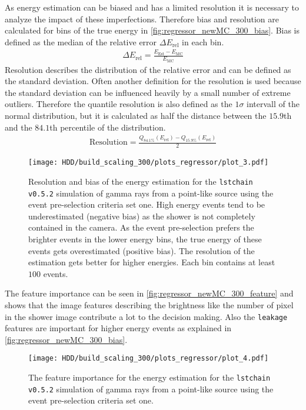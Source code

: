 As energy estimation can be biased and has a limited resolution it is necessary to analyze the impact of these imperfections. 
Therefore bias and resolution are calculated for bins of the true energy in \autoref{fig:regressor_newMC_300_bias}.
Bias is defined as the median of the relative error $\Delta E_\text{rel}$ in each bin.
\begin{align}
    \Delta E_\text{rel} = \frac{E_\text{Est} - E_\text{MC}}{E_\text{MC}}
\end{align}
Resolution describes the distribution of the relative error and can be defined as the standard deviation.
Often another definition for the resolution is used because the standard deviation can be influenced heavily by a small number of extreme outliers.
Therefore the quantile resolution is also defined as the $1\sigma$ intervall of the normal distribution, but it is calculated as half the distance 
between the $\num{15.9}$th and the $\num{84.1}$th percentile of the distribution.
\begin{align}
    \text{Resolution} = \frac{Q_\text{84.1\%}(E_\text{rel}) - Q_\text{15.9\%}(E_\text{rel})}{2}
\end{align}
\begin{figure}
    \centering
    \texttt{[image: HDD/build\_scaling\_300/plots\_regressor/plot\_3.pdf]}
    \caption{Resolution and bias of the energy estimation for the \texttt{lstchain v0.5.2} simulation of gamma rays from a point-like source 
        using the event pre-selection criteria set one.
        High energy events tend to be underestimated (negative bias) as the shower is not completely contained in the camera.
        As the event pre-selection prefers the brighter events in the lower energy bins, the true energy of these events gets overestimated (positive bias).
        The resolution of the estimation gets better for higher energies.
        Each bin contains at least $\num{100}$ events.
    }
    \label{fig:regressor_newMC_300_bias}
\end{figure}

The feature importance can be seen in \autoref{fig:regressor_newMC_300_feature} and shows that the image features describing the brightness 
like the number of pixel in the shower image contribute a lot to the decision making.
Also the \texttt{leakage} features are important for higher energy events as explained in \autoref{fig:regressor_newMC_300_bias}.
\begin{figure}
    \centering
    \texttt{[image: HDD/build\_scaling\_300/plots\_regressor/plot\_4.pdf]}
    \caption{The feature importance for the energy estimation for the \texttt{lstchain v0.5.2} simulation of gamma rays from a point-like source using 
        the event pre-selection criteria set one.
    }
    \label{fig:regressor_newMC_300_feature}
\end{figure}

